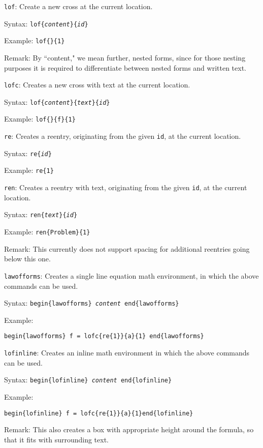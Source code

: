 \documentclass[12pt]{article}
\newenvironment{Description}[1]{%
	\begin{list}{nothing}{\setlength{\leftmargin}{#1}
			\setlength{\labelwidth}{\leftmargin}\setlength{\labelsep}{1mm}}}
	{\end{list}}
\newcommand{\BS}{\texttt{\symbol{`\\}}}
\newcommand{\Macro}[1]{\texttt{\BS#1}}
\newcommand{\FormatTeXMacro}[1]{\Macro{#1}\hfill :}
\begin{document}
\begin{Description}{4cm}
	\item[\FormatTeXMacro{lof}] Create a new cross at the current location.
	
	Syntax: \Macro{lof\{\textit{content}\}\{\textit{id}\}}
	
	Example: \Macro{lof\{\}\{1\}}
	
	Remark: By ``content," we mean further, nested forms, since for those nesting purposes it is required to differentiate between nested forms and written text.
	
	\item[\FormatTeXMacro{lofc}] Creates a new cross with text at the current location.
	
	Syntax: \Macro{lof\{\textit{content}\}\{\textit{text}\}\{\textit{id}\}}
	
	Example: \Macro{lof\{\}\{f\}\{1\}}
	
	\item[\FormatTeXMacro{re}] Creates a reentry, originating from the given \texttt{id}, at the current location.
	
	Syntax: \Macro{re\{\textit{id}\}}
	
	Example: \Macro{re\{1\}}
	
	\item[\FormatTeXMacro{ren}] Creates a reentry with text, originating from the given \texttt{id}, at the current location.
	
	Syntax: \Macro{ren\{\textit{text}\}\{\textit{id}\}}
	
	Example: \Macro{ren\{Problem\}\{1\}}
	
	Remark: This currently does not support spacing for additional reentries going below this one.
	
	\item[\FormatTeXMacro{lawofforms}] Creates a single line equation math environment, in which the above commands can be used.
	
	Syntax: \Macro{begin\{lawofforms\} \textit{content} \BS end\{lawofforms\}}

	Example:
	
		\Macro{begin\{lawofforms\}
		f = \BS lofc\{\BS re\{1\}\}\{a\}\{1\}
	\BS end\{lawofforms\}}

	\item[\FormatTeXMacro{lofinline}] Creates an inline math environment in which the above commands can be used.
	
	Syntax: \Macro{begin\{lofinline\} \textit{content} \BS end\{lofinline\}}
	
	Example:
	
	\Macro{begin\{lofinline\} f = \BS lofc\{\BS re\{1\}\}\{a\}\{1\}\BS end\{lofinline\}}
	
	Remark: This also creates a box with appropriate height around the formula, so that it fits with surrounding text.
\end{Description}
\end{document}
